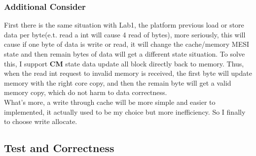 \mathbb{R} \documentclass{article}
\begin{document}
\subsubsection{Additional Consider}
First there is the same situation with Lab1, the platform previous load or store data per byte(e.t. read a int will cause 4 read of bytes), more seriously, this will cause if one byte of data is write or read, it will change the cache/memory MESI state and then remain bytes of data will get a different state situation. To solve this, I support \textbf{CM} state data update all block directly back to memory. Thus, when the read int request to invalid memory is received, the first byte will update memory with the right core copy, and then the remain byte will get a valid memory copy, which do not harm to data correctness.\\
What's more, a write through cache will be more simple and easier to implemented, it actually used to be my choice but more inefficiency. So I finally to choose write allocate.\\ 
\subsection{Test and Correctness}
\end{document}
